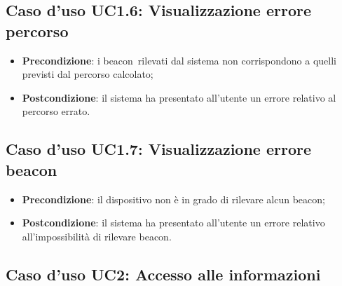 \documentclass[../AnalisiDeiRequisiti.tex]{subfiles}
\begin{document}
\subsection{Caso d'uso UC1.6: Visualizzazione errore percorso}
\begin{itemize}
    \item \textbf{Precondizione}: i beacon\g\ rilevati dal sistema non corrispondono a quelli previsti dal percorso calcolato;
    \item \textbf{Postcondizione}: il sistema ha presentato all'utente un errore relativo al percorso errato.
  \end{itemize}
\hypertarget{UC1.7}{}
\subsection{Caso d'uso UC1.7: Visualizzazione errore beacon}
\begin{itemize}
    \item \textbf{Precondizione}: il dispositivo non è in grado di rilevare alcun beacon\g;
    \item \textbf{Postcondizione}: il sistema ha presentato all'utente un errore relativo all'impossibilità di rilevare beacon\g.
  \end{itemize}
\hypertarget{UC2}{}
\subsection{Caso d'uso UC2: Accesso alle informazioni}
\end{document}
